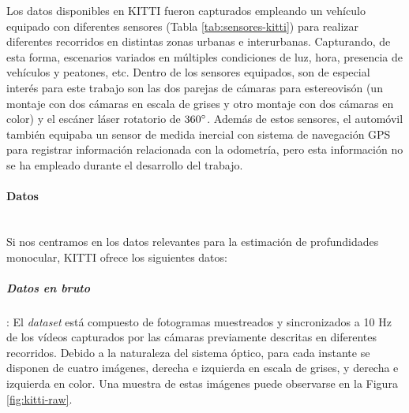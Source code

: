 Los datos disponibles en KITTI fueron capturados empleando un vehículo equipado con diferentes sensores (Tabla \ref{tab:sensores-kitti}) para realizar diferentes recorridos en distintas zonas urbanas e interurbanas. Capturando, de esta forma, escenarios variados en múltiples condiciones de luz, hora, presencia de vehículos y peatones, etc. Dentro de los sensores equipados, son de especial interés para este trabajo son las dos parejas de cámaras para estereovisón (un montaje con dos cámaras en escala de grises y otro montaje con dos cámaras en color) y el escáner láser rotatorio de $360\degree$. Además de estos sensores, el automóvil también equipaba un sensor de medida inercial con sistema de navegación GPS para registrar información relacionada con la odometría, pero esta información no se ha empleado durante el desarrollo del trabajo.

 
 

\paragraph{Datos}\mbox{}\\
Si nos centramos en los datos relevantes para la estimación de profundidades monocular, KITTI ofrece los siguientes datos:

\subparagraph{Datos en bruto}:
El \textit{dataset} está compuesto de fotogramas muestreados y sincronizados a 10 Hz de los vídeos capturados por las cámaras previamente descritas en diferentes recorridos. Debido a la naturaleza del sistema óptico, para cada instante se disponen de cuatro imágenes, derecha e izquierda en escala de grises, y derecha e izquierda en color. Una muestra de estas imágenes puede observarse en la Figura \ref{fig:kitti-raw}.

